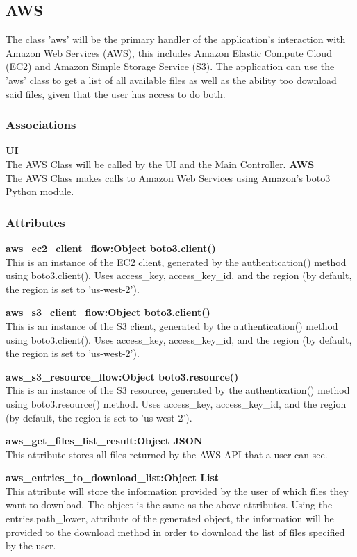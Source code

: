 \subsection{AWS}
The class 'aws' will be the primary handler of the application's interaction with Amazon Web Services (AWS),
this includes Amazon Elastic Compute Cloud (EC2) and Amazon Simple Storage Service (S3). The application
can use the 'aws' class to get a list of all available files as well as the ability too download said files, 
given that the user has access to do both.

\subsubsection{Associations}
\textbf{UI} \\
The AWS Class will be called by the UI and the Main Controller.
\textbf{AWS} \\
The AWS Class makes calls to Amazon Web Services using Amazon's boto3 Python module.

\subsubsection{Attributes}
\textbf{aws\_ec2\_client\_flow:Object boto3.client()} \\
    This is an instance of the EC2 client, generated by the authentication() method using boto3.client(). Uses access\_key, access\_key\_id, and the region (by default, the region is set to 'us-west-2'). 

\textbf{aws\_s3\_client\_flow:Object boto3.client()} \\
    This is an instance of the S3 client, generated by the authentication() method using boto3.client(). Uses access\_key, access\_key\_id, and the region (by default, the region is set to 'us-west-2').

\textbf{aws\_s3\_resource\_flow:Object boto3.resource()} \\
    This is an instance of the S3 resource, generated by the authentication() method using boto3.resource() method. Uses access\_key, access\_key\_id, and the region (by default, the region is set to 'us-west-2').

\textbf{aws\_get\_files\_list\_result:Object JSON} \\
    This attribute stores all files returned by the AWS API that a user can see.

\textbf{aws\_entries\_to\_download\_list:Object List} \\
    This attribute will store the information provided by the user of which files they want to download. The object is the same as the above 
    attributes. Using the entries.path\_lower, attribute of the generated object, the information will be provided to the download method in 
    order to download the list of files specified by the user.

